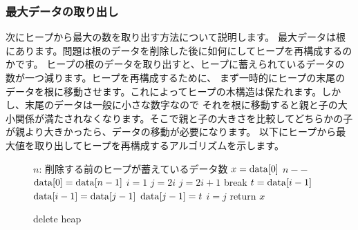 \documentclass[dvipdfmx,pic,eepic,ecltree]{jarticle}
\begin{document}
\subsubsection{最大データの取り出し}
次にヒープから最大の数を取り出す方法について説明します。
最大データは根にあります。問題は根のデータを削除した後に如何にしてヒープを再構成するのかです。
ヒープの根のデータを取り出すと、ヒープに蓄えられているデータの数が一つ減ります。ヒープを再構成するために、
まず一時的にヒープの末尾のデータを根に移動させます。これによってヒープの木構造は保たれます。しかし、末尾のデータは一般に小さな数字なので
それを根に移動すると親と子の大小関係が満たされなくなります。そこで親と子の大きさを比較してどちらかの子が親より大きかったら、データの移動が必要になります。
以下にヒープから最大値を取り出してヒープを再構成するアルゴリズムを示します。
\begin{figure}[H]
\begin{algorithm}[H]
	\caption{delete heap}
	\label{delete heap}
	\begin{algorithmic}[1]
	\STATE $n$: 削除する前のヒープが蓄えているデータ数
	\STATE $x={\rm data}[0]$
	\STATE $n--$
	\STATE ${\rm data}[0]={\rm data}[n-1]$
	\STATE $i=1$
	\STATE $j=2i$
	\STATE $j=2i+1$
	\ENDIF
	\STATE break
	\ELSE
	\STATE $t={\rm data}[i-1]$
	\STATE ${\rm data}[i-1]={\rm data}[j-1]$
	\STATE ${\rm data}[j-1]=t$
	\ENDIF
	\STATE $i=j$
	\ENDWHILE
	\STATE return $x$
	\end{algorithmic}
\end{algorithm}
\end{figure}
\end{document}
